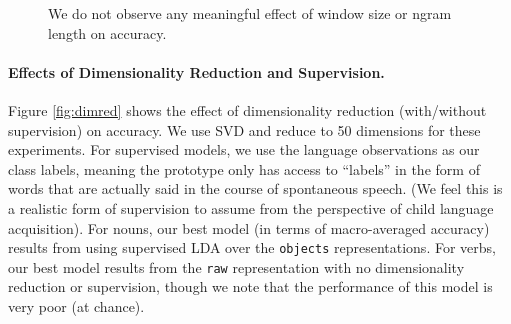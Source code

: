 \documentclass[11pt]{article}
\begin{document}
\begin{figure}[ht!]
\centering
{}%
%
\caption{We do not observe any meaningful effect of window size or ngram length on accuracy.}
\label{fig:kw}
\end{figure}

\paragraph{Effects of Dimensionality Reduction and Supervision.} 

Figure \ref{fig:dimred} shows the effect of dimensionality reduction (with/without supervision) on accuracy. We use SVD and reduce to 50 dimensions for these experiments. For supervised models, we use the language observations as our class labels, meaning the prototype only has access to ``labels'' in the form of words that are actually said in the course of spontaneous speech. (We feel this is a realistic form of supervision to assume from the perspective of child language acquisition). For nouns, our best model (in terms of macro-averaged accuracy) results from using supervised LDA over the \texttt{objects} representations. For verbs, our best model results from the \texttt{raw} representation with no dimensionality reduction or supervision, though we note that the performance of this model is very poor (at chance). 
\end{document}

